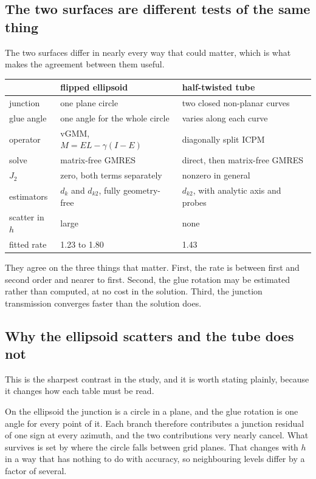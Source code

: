 \subsection{The two surfaces are different tests of the same thing}

The two surfaces differ in nearly every way that could matter, which is
what makes the agreement between them useful.

\begin{center}
\small
\begin{tabular}{@{}lll@{}}
\toprule
 & flipped ellipsoid & half-twisted tube \\
\midrule
junction      & one plane circle & two closed non-planar curves \\
glue angle    & one angle for the whole circle
              & varies along each curve \\
operator      & vGMM, $M = EL - \gamma(I-E)$
              & diagonally split ICPM \\
solve         & matrix-free GMRES
              & direct, then matrix-free GMRES \\
$J_2$         & zero, both terms separately
              & nonzero in general \\
estimators    & $d_k$ and $d_{k2}$, fully geometry-free
              & $d_{k2}$, with analytic axis and probes \\
scatter in $h$ & large & none \\
fitted rate   & 1.23 to 1.80 & 1.43 \\
\bottomrule
\end{tabular}
\end{center}

They agree on the three things that matter. First, the rate is between
first and second order and nearer to first. Second, the glue rotation may
be estimated rather than computed, at no cost in the solution. Third, the
junction transmission converges faster than the solution does.

\subsection{Why the ellipsoid scatters and the tube does not}

This is the sharpest contrast in the study, and it is worth stating
plainly, because it changes how each table must be read.

On the ellipsoid the junction is a circle in a plane, and the glue
rotation is one angle for every point of it. Each branch therefore
contributes a junction residual of one sign at every azimuth, and the two
contributions very nearly cancel. What survives is set by where the
circle falls between grid planes. That changes with $h$ in a way that has
nothing to do with accuracy, so neighbouring levels differ by a factor of
several.

